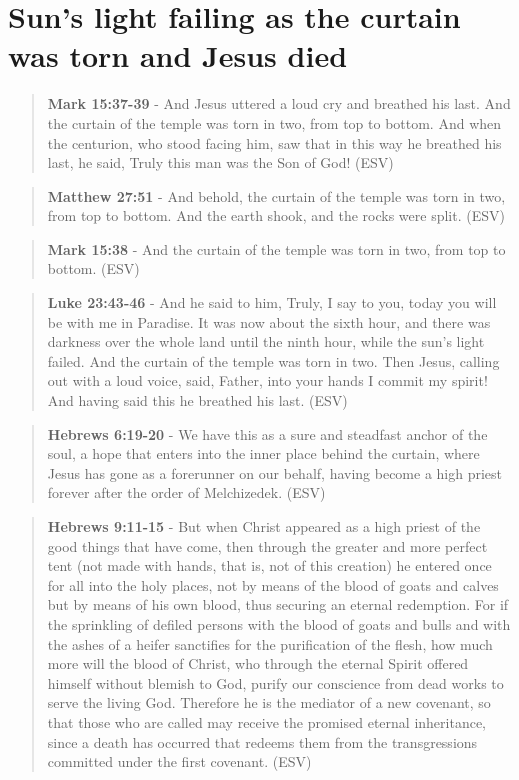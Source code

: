 \documentclass[11pt]{article}
\begin{document}
\section{Sun's light failing as the curtain was torn and Jesus died}
\label{sec:org63f2eb2}
\begin{quote}
\textbf{Mark 15:37-39} - And Jesus uttered a loud cry and breathed his last. And the curtain of the temple was torn in two, from top to bottom. And when the centurion, who stood facing him, saw that in this way he breathed his last, he said, Truly this man was the Son of God! (ESV)
\end{quote}

\begin{quote}
\textbf{Matthew 27:51} - And behold, the curtain of the temple was torn in two, from top to bottom. And the earth shook, and the rocks were split. (ESV)
\end{quote}

\begin{quote}
\textbf{Mark 15:38} - And the curtain of the temple was torn in two, from top to bottom. (ESV)
\end{quote}

\begin{quote}
\textbf{Luke 23:43-46} - And he said to him, Truly, I say to you, today you will be with me in Paradise. It was now about the sixth hour, and there was darkness over the whole land until the ninth hour, while the sun's light failed. And the curtain of the temple was torn in two. Then Jesus, calling out with a loud voice, said, Father, into your hands I commit my spirit! And having said this he breathed his last. (ESV)
\end{quote}

\begin{quote}
\textbf{Hebrews 6:19-20} - We have this as a sure and steadfast anchor of the soul, a hope that enters into the inner place behind the curtain, where Jesus has gone as a forerunner on our behalf, having become a high priest forever after the order of Melchizedek. (ESV)
\end{quote}

\begin{quote}
\textbf{Hebrews 9:11-15} - But when Christ appeared as a high priest of the good things that have come, then through the greater and more perfect tent (not made with hands, that is, not of this creation) he entered once for all into the holy places, not by means of the blood of goats and calves but by means of his own blood, thus securing an eternal redemption. For if the sprinkling of defiled persons with the blood of goats and bulls and with the ashes of a heifer sanctifies for the purification of the flesh, how much more will the blood of Christ, who through the eternal Spirit offered himself without blemish to God, purify our conscience from dead works to serve the living God. Therefore he is the mediator of a new covenant, so that those who are called may receive the promised eternal inheritance, since a death has occurred that redeems them from the transgressions committed under the first covenant. (ESV)
\end{quote}
\end{document}
